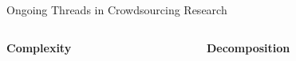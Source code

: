 \documentclass[presentation]{subfiles}
\begin{document}
\begin{frame}[t]{Ongoing Threads in Crowdsourcing Research}

\begin{minipage}[t][25mm][t]{\textwidth}
\begin{columns}
\begin{column}[T]{0.5\textwidth}
    \begin{block}{\textbf{\large Complexity}}
    \scriptsize{\textcite{suzukiAtelier,KimStoria,yuanAlmost,Yu2016b,Nebeling:2016:WCW:2858036.2858169,Hahn:2016:KAB:2858036.2858364,crowdForgeKittur}}
    \end{block}
    \end{column}
    \begin{column}[T]{0.5\textwidth}
  \begin{block}{\textbf{\large Decomposition}}
    \scriptsize{\textcite{sensitiveTasks,LykourentzouPersonalityMatters,Law:2016:CKC:2858036.2858144,Chang:2016:ACC:2858036.2858411,Newell:2016:OMA:2858036.2858490}}
    \end{block}


\end{column}


    
    

\end{columns}
\end{minipage}
\end{frame}
\end{document}
